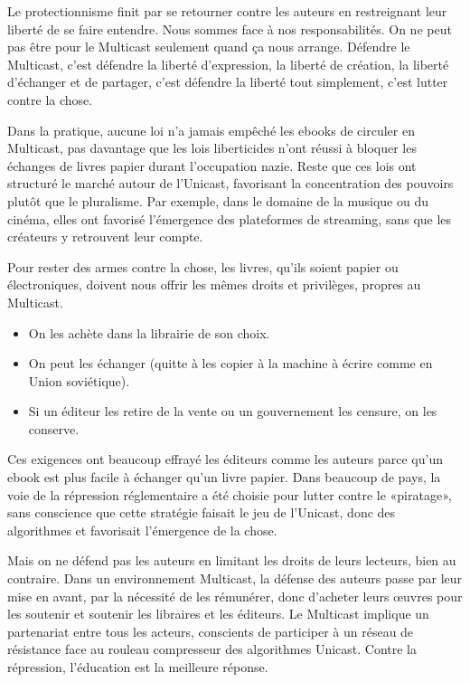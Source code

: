\documentclass[a5paper, 10pt, twoside]{book}
\providecommand{\tightlist}{%
  \setlength{\itemsep}{0pt}\setlength{\parskip}{0pt}%
}
\begin{document}
Le protectionnisme finit par se retourner contre les auteurs en
restreignant leur liberté de se faire entendre. Nous sommes face à nos
responsabilités. On ne peut pas être pour le Multicast seulement quand
ça nous arrange. Défendre le Multicast, c’est défendre la liberté
d’expression, la liberté de création, la liberté d’échanger et de
partager, c’est défendre la liberté tout simplement, c’est lutter contre
la chose.

Dans la pratique, aucune loi n’a jamais empêché les ebooks de circuler
en Multicast, pas davantage que les lois liberticides n’ont réussi à
bloquer les échanges de livres papier durant l’occupation nazie. Reste
que ces lois ont structuré le marché autour de l’Unicast, favorisant la
concentration des pouvoirs plutôt que le pluralisme. Par exemple, dans
le domaine de la musique ou du cinéma, elles ont favorisé l’émergence
des plateformes de streaming, sans que les créateurs y retrouvent leur
compte.

Pour rester des armes contre la chose, les livres, qu’ils soient papier
ou électroniques, doivent nous offrir les mêmes droits et privilèges,
propres au Multicast.

\begin{itemize}
\tightlist
\item
  On les achète dans la librairie de son choix.
\item
  On peut les échanger (quitte à les copier à la machine à écrire comme
  en Union soviétique).
\item
  Si un éditeur les retire de la vente ou un gouvernement les censure,
  on les conserve.
\end{itemize}

Ces exigences ont beaucoup effrayé les éditeurs comme les auteurs parce
qu’un ebook est plus facile à échanger qu’un livre papier. Dans beaucoup
de pays, la voie de la répression réglementaire a été choisie pour
lutter contre le «piratage», sans conscience que cette stratégie faisait
le jeu de l’Unicast, donc des algorithmes et favorisait l’émergence de
la chose.

Mais on ne défend pas les auteurs en limitant les droits de leurs
lecteurs, bien au contraire. Dans un environnement Multicast, la défense
des auteurs passe par leur mise en avant, par la nécessité de les
rémunérer, donc d’acheter leurs œuvres pour les soutenir et soutenir les
libraires et les éditeurs. Le Multicast implique un partenariat entre
tous les acteurs, conscients de participer à un réseau de résistance
face au rouleau compresseur des algorithmes Unicast. Contre la
répression, l’éducation est la meilleure réponse.
\end{document}
